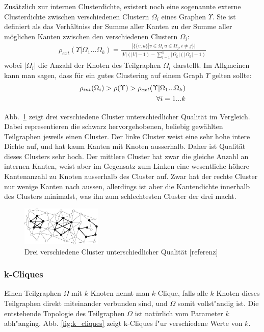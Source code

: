 \documentclass[journal]{vgtc}
\begin{document}
  Zusätzlich zur internen Clusterdichte, existert noch eine sogenannte externe Clusterdichte 
  zwischen verschiedenen Clustern $\Omega_i$ eines Graphen $\Upsilon$. Sie ist definiert als
  das Verhältniss der Summe aller Kanten zu der Summe aller möglichen Kanten zwischen den
  verschiedenen Clustern $\Omega_i$:
    \begin{align}
      \rho_{ext}(\Upsilon|\Omega_1 ... \Omega_k) = \frac{|\{\{v,u\} | v\in \Omega_i\, u \in \Omega_j, i \neq j\}|}
                                                        {|V|(|V|-1)-\sum\limits_{l=1}^k |\Omega_k|(|\Omega_k|-1)}
    \end{align}
  wobei $|\Omega_i|$ die Anzahl der Knoten des Teilgraphen $\Omega_i$ darstellt.
  Im Allgmeinen kann man sagen, dass für ein gutes Clustering auf einem Graph $\Upsilon$ gelten sollte:
    \begin{align}
      \rho_{int}(\Omega_i) > \rho(\Upsilon) > \rho_{ext}(\Upsilon|\Omega_1 ... \Omega_k) \\ 
      			\forall i=1...k \notag
    \end{align}
  
  Abb.~\ref{fig:comp_cluster} zeigt drei verschiedene Cluster unterschiedlicher Qualität im Vergleich.
  Dabei representieren die schwarz hervorgehobenen, beliebig gewählten Teilgraphen jeweils 
  einen Cluster. Der linke Cluster weist eine sehr hohe intere
  Dichte auf, und hat kaum Kanten mit Knoten ausserhalb. Daher ist Qualität dieses Clusters
  sehr hoch. Der mittlere Cluster hat zwar die gleiche Anzahl an internen Kanten, weist
  aber im Gegensatz zum Linken eine wesentliche höhere Kantenanzahl zu Knoten ausserhalb des
  Cluster auf. Zwar hat der rechte Cluster nur wenige Kanten nach aussen, allerdings ist aber
  die Kantendichte innerhalb des Clusters minimalst, was ihn zum schlechtesten Cluster der drei macht.

  \begin{figure}[h]
    \centering
    \includegraphics[width=1.5in]{images/good_cluster}
    \caption{\label{fig:comp_cluster} Drei verschiedene Cluster unterschiedlicher Qualität [referenz]}
  \end{figure}
  
  \subsubsection{k-Cliques}
  	Einen Teilgraphen $\Omega$ mit $k$ Knoten nennt man $k$-Clique, falls alle $k$ Knoten dieses 
  	Teilgraphen direkt miteinander verbunden sind, und $\Omega$ somit vollst"andig ist. 
  	Die entstehende Topologie des Teilgraphen $\Omega$ ist natürlich vom Parameter $k$ abh"anging.
  	Abb. \ref{fig:k_cliques} zeigt k-Cliques f"ur verschiedene Werte von $k$.
  	
\end{document}

